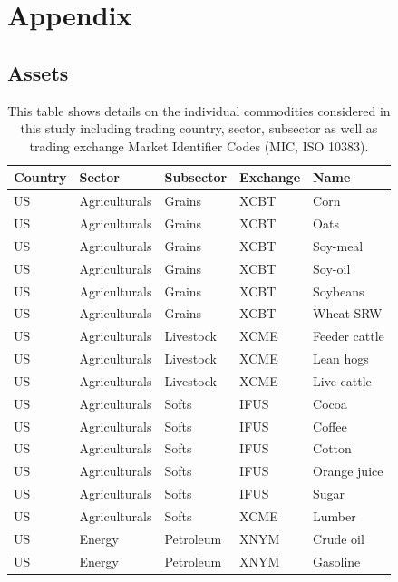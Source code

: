 \documentclass[]{elsarticle} %
\begin{document}
\hypertarget{appendix}{%
\section{Appendix}\label{appendix}}

\hypertarget{assets}{%
\subsection{Assets}\label{assets}}

\begingroup\fontsize{10}{12}\selectfont

\begin{longtabu} to 
\caption{\label{tab:`appendix - assets`}This table shows details on the individual commodities considered in this study including trading country, sector, subsector as well as trading exchange Market Identifier Codes (MIC, ISO 10383).}\\
\toprule
Country & Sector & Subsector & Exchange & Name\\
\midrule
US & Agriculturals & Grains & XCBT & Corn\\
US & Agriculturals & Grains & XCBT & Oats\\
US & Agriculturals & Grains & XCBT & Soy-meal\\
US & Agriculturals & Grains & XCBT & Soy-oil\\
US & Agriculturals & Grains & XCBT & Soybeans\\
US & Agriculturals & Grains & XCBT & Wheat-SRW\\
US & Agriculturals & Livestock & XCME & Feeder cattle\\
US & Agriculturals & Livestock & XCME & Lean hogs\\
US & Agriculturals & Livestock & XCME & Live cattle\\
US & Agriculturals & Softs & IFUS & Cocoa\\
US & Agriculturals & Softs & IFUS & Coffee\\
US & Agriculturals & Softs & IFUS & Cotton\\
US & Agriculturals & Softs & IFUS & Orange juice\\
US & Agriculturals & Softs & IFUS & Sugar\\
US & Agriculturals & Softs & XCME & Lumber\\
US & Energy & Petroleum & XNYM & Crude oil\\
US & Energy & Petroleum & XNYM & Gasoline\\

\end{longtabu}
\end{document}
